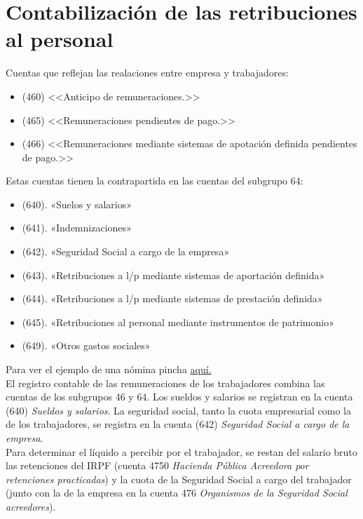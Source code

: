 \documentclass[a4paper,12pt]{article}
\begin{document}
\newpage
\section{Contabilización de las retribuciones al personal}

Cuentas que reflejan las realaciones entre empresa y trabajadores:
\begin{itemize}
    \item (460) <<Anticipo de remuneraciones.>>
    \item (465) <<Remuneraciones pendientes de pago.>>
    \item (466) <<Remuneraciones mediante sistemas de apotación definida pendientes de pago.>>
\end{itemize}

Estas cuentas tienen la contrapartida en las cuentas del subgrupo 64:
\begin{itemize}
    \item (640). «Suelos y salarios»
    \item (641). «Indemnizaciones»
    \item (642). «Seguridad Social a cargo de la empresa»
    \item (643). «Retribuciones a l/p mediante sistemas de aportación definida»
    \item (644). «Retribuciones a l/p mediante sistemas de prestación definida»
    \item (645). «Retribuciones al personal mediante instrumentos de patrimonio»
    \item (649). «Otros gastos sociales»
\end{itemize}

Para ver el ejemplo de una nómina pincha \href{https://github.com/ElblogdeIsmael/ElblogdeIsmael.github.io/blob/main/Asignaturas/Tercer%20A%C3%B1o/CF1/Resumenes/Tema4/FCCEE/images/partes_nomina.png}{aquí.}\\

\newpage
El registro contable de las remuneraciones de los trabajadores combina las cuentas de los subgrupos 46 y 64. Los sueldos y salarios se registran en la cuenta (640) \textit{Sueldos y salarios}. La seguridad social, tanto la cuota empresarial como la de los trabajadores, se registra en la cuenta (642) \textit{Seguridad Social a cargo de la empresa}.\\

Para determinar el líquido a percibir por el trabajador, se restan del salario bruto las retenciones del IRPF (cuenta 4750 \textit{Hacienda Pública Acreedora por retenciones practicadas}) y la cuota de la Seguridad Social a cargo del trabajador (junto con la de la empresa en la cuenta 476 \textit{Organismos de la Seguridad Social acreedores}).\\
\end{document}
